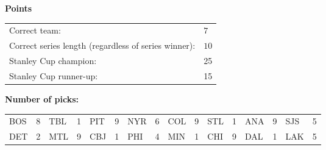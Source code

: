 \documentclass[10pt]{article}
\begin{document}
{\bf Points}\\
\begin{minipage}{12cm}
    \begin{tabular}{l l}
        Correct team:	& $7$\\
        Correct series length (regardless of series winner):	& $10$\\
        Stanley Cup champion:	& 25\\
        Stanley Cup runner-up:	& 15\\
    \end{tabular}

    \vspace{0.5cm}
    {\bf Number of picks:}\\
    \begin{tabular}{lc | lc | lc | lc | lc | lc | lc | lc }
        BOS & 8 & TBL & 1 & PIT & 9 & NYR & 6 & COL & 9 & STL & 1 & ANA & 9 & SJS & 5 \\
        DET & 2 & MTL & 9 & CBJ & 1 & PHI & 4 & MIN & 1 & CHI & 9 & DAL & 1 & LAK & 5 \\
    \end{tabular}
\end{minipage}
\end{document}
